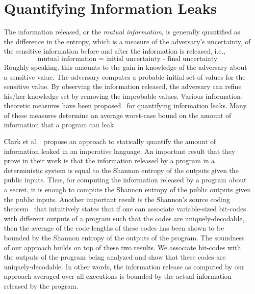 \section{Quantifying Information Leaks}
\label{sec:bgqif}

The information released, or the \emph{mutual information}, is
generally quantified as the difference in the entropy, which is a
measure of the adversary's uncertainty, of the sensitive information 
before and after the information is released, i.e.,  
$$\text{mutual information = initial uncertainty - final
  uncertainty}$$ 
Roughly speaking, this amounts to the gain in knowledge of the
adversary about a sensitive value. The adversary computes a probable
initial set of values for the sensitive value. By observing the
information released, the adversary can refine his/her knowledge set
by removing the improbable values.
Various information-theoretic measures have been proposed~\cite{shannon, guessing, 
  smith2009, clarkson2009, csf12GLeakage} for quantifying information
leaks. Many of these measures determine an average worst-case bound on 
the amount of information that a program can leak. 

Clark et al.~\cite{clark} propose an approach to statically 
quantify the amount of information leaked in an imperative language.
An important result that they prove in their work is that the information 
released by a program in a deterministic system is equal to the Shannon 
entropy of the outputs given the public inputs. Thus, for computing the 
information released by a program about a secret, it is enough to compute
the Shannon entropy of the public outputs given the public inputs. 
Another important result is the Shannon's source coding 
theorem~\cite{shannon} that intuitively states that 
if one can associate variable-sized bit-codes with different outputs 
of a program such that the codes are uniquely-decodable, 
then the average of the code-lengths of these codes has been shown 
to be bounded by the Shannon entropy of the outputs of the program. 
The soundness of our approach builds on top of these two results. 
We associate bit-codes with the outputs of the program being analyzed 
and show that these codes are uniquely-decodable. In other words, 
the information release as computed by our approach averaged over 
all executions is bounded by the actual information released by the program.
